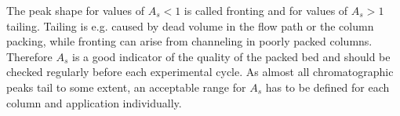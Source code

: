 The peak shape for values of $A_{s} < 1$ is called fronting and for values of $A_{s} > 1$ tailing. Tailing is e.g. caused by dead volume in the flow path or the column packing, while fronting can arise from channeling in poorly packed columns. Therefore $A_{s}$ is a good indicator of the quality of the packed bed and should be checked regularly before each experimental cycle. As almost all chromatographic peaks tail to some extent, an acceptable range for $A_{s}$ has to be defined for each column and application individually.  

% 
% 
% 
